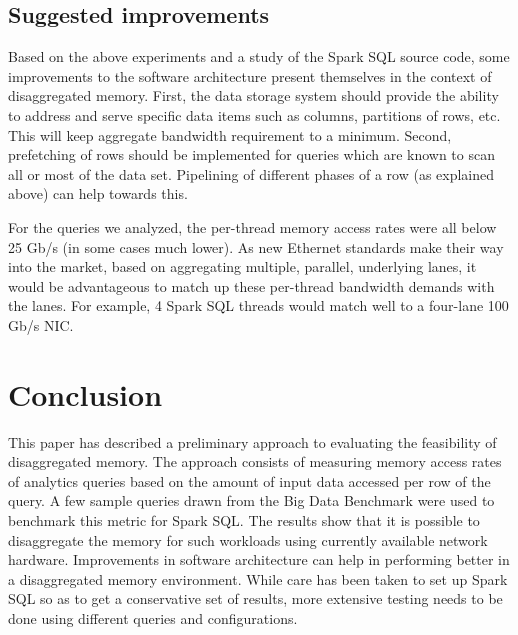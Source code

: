 \documentclass{sig-alternate-05-2015}
\begin{document}
\subsection{Suggested improvements}

Based on the above experiments and a study of the Spark SQL source code, some
improvements to the software architecture present themselves in the context of
disaggregated memory.  First, the data storage system should provide the
ability to address and serve specific data items such as columns, partitions of
rows, etc.  This will keep aggregate bandwidth requirement to a minimum.
Second, prefetching of rows should be implemented for queries which are known
to scan all or most of the data set. Pipelining of different phases of a row
(as explained above) can help towards this.

For the queries we analyzed, the per-thread memory access rates were all below
25 Gb/s (in some cases much lower).  As new Ethernet standards make their way
into the market, based on aggregating multiple, parallel, underlying lanes, it
would be advantageous to match up these per-thread bandwidth demands with the
lanes.  For example, 4 Spark SQL threads would match well to a four-lane 100
Gb/s NIC.

\section{Conclusion}

This paper has described a preliminary approach to evaluating the feasibility
of disaggregated memory. The approach consists of measuring memory access rates
of analytics queries based on the amount of input data accessed per row of the
query. A few sample queries drawn from the Big Data Benchmark
\cite{bigDataBenchmark} were used to benchmark this metric for Spark SQL.  The
results show that it is possible to disaggregate the memory for such workloads
using currently available network hardware.  Improvements in software
architecture can help in performing better in a disaggregated memory
environment. While care has been taken to set up Spark SQL so as to get a
conservative set of results, more extensive testing needs to be done using
different queries and configurations.

 

\label{last-page}
\end{document}
